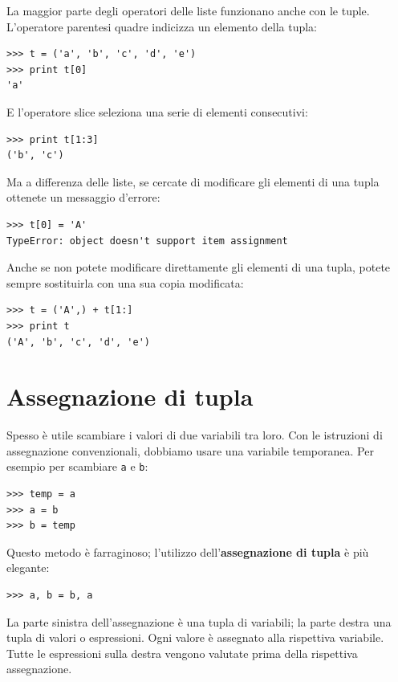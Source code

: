 \documentclass[10pt]{book}
\begin{document}
La maggior parte degli operatori delle liste funzionano anche con le tuple. L'operatore parentesi quadre indicizza un elemento della tupla:

\begin{verbatim}
>>> t = ('a', 'b', 'c', 'd', 'e')
>>> print t[0]
'a'
\end{verbatim}
%
E l'operatore slice seleziona una serie di elementi consecutivi:

\begin{verbatim}
>>> print t[1:3]
('b', 'c')
\end{verbatim}
%
Ma a differenza delle liste, se cercate di modificare gli elementi di una tupla ottenete un messaggio d'errore:

\begin{verbatim}
>>> t[0] = 'A'
TypeError: object doesn't support item assignment
\end{verbatim}
%
Anche se non potete modificare direttamente gli elementi di una tupla, potete sempre sostituirla con una sua copia modificata:

\begin{verbatim}
>>> t = ('A',) + t[1:]
>>> print t
('A', 'b', 'c', 'd', 'e')
\end{verbatim}
%

\section{Assegnazione di tupla}
\label{tuple.assignment}

Spesso è utile scambiare i valori di due variabili tra loro. Con le istruzioni di assegnazione convenzionali, dobbiamo usare una variabile temporanea. Per esempio per scambiare {\tt a} e {\tt b}:

\begin{verbatim}
>>> temp = a
>>> a = b
>>> b = temp
\end{verbatim}
%
Questo metodo è farraginoso; l'utilizzo dell'{\bf assegnazione di tupla} è più elegante:

\begin{verbatim}
>>> a, b = b, a
\end{verbatim}
%
La parte sinistra dell'assegnazione è una tupla di variabili; la parte
   destra una tupla di valori o espressioni. Ogni valore è assegnato alla rispettiva variabile. Tutte le espressioni sulla destra vengono valutate prima della rispettiva assegnazione.
\end{document}
